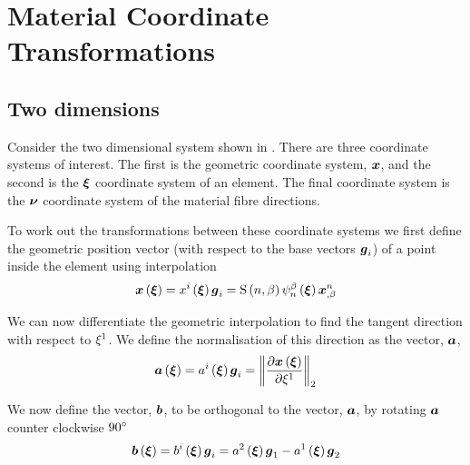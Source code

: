 \section{Material Coordinate Transformations}
\label{sec:MaterialCoordinateTransformations}

\subsection{Two dimensions}
\label{subsec:MaterialCoordinateTransformationsTwoD}

Consider the two dimensional system shown in
. There are three
coordinate systems of interest. The first is the geometric coordinate
system, $ \boldsymbol{x} $, and the second is the $ \boldsymbol{\xi} $ coordinate
system of an element. The final coordinate system is the $ \boldsymbol{\nu} $
coordinate system of the material fibre directions.


To work out the transformations between these coordinate systems we
first define the geometric position vector (with respect to the base vectors $  \boldsymbol{ g }  _{i}$) of a point inside the element
using interpolation \ie
\begin{equation}
    \boldsymbol{x} \left(  \boldsymbol{\xi}  \right) = x^{i}\left(  \boldsymbol{\xi}  \right)   \boldsymbol{ g }  _{i}=
     \mathrm{S} \left( n,\beta \right)     \psi_{n}^{\beta} \left(  \boldsymbol{\xi}  \right)    { \boldsymbol{x} }^{n} _{,\beta} 
\end{equation}

We can now differentiate the geometric interpolation to find the tangent direction with respect to $\xi^{1}$. We define the normalisation of this direction as the vector, $ \boldsymbol{a} $, \ie
\begin{equation}
    \boldsymbol{a} \left(  \boldsymbol{\xi}  \right) = a^{i}\left(  \boldsymbol{\xi}  \right)   \boldsymbol{ g }  _{i}= {\left\|  \dfrac{\partial   \boldsymbol{x} \left(  \boldsymbol{\xi}  \right) }{\partial \xi^{1}}  \right\|_{2}} 
\end{equation}

We now define the vector, $ \boldsymbol{b} $, to be orthogonal to the vector, $ \boldsymbol{a} $, by rotating $ \boldsymbol{a} $ counter clockwise
$90^{\circ}$ \ie
\begin{equation}
    \boldsymbol{b} \left(  \boldsymbol{\xi}  \right) = b^{i}\left(  \boldsymbol{\xi}  \right)   \boldsymbol{ g }  _{i}=
   a^{2}\left(  \boldsymbol{\xi}  \right)   \boldsymbol{ g }  _{1}- a^{1}\left(  \boldsymbol{\xi}  \right)   \boldsymbol{ g }  _{2}
\end{equation}

